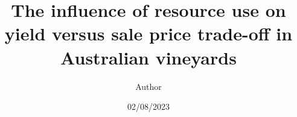 \documentclass[review,12pt,authoryear]{elsarticle}
\begin{document}
\begin{linenumbers}
\begin{frontmatter}
\title{The influence of resource use on yield versus sale price trade-off in Australian vineyards}
\author[label1,label2,label3]{Author}
\date{02/08/2023}
\begin{abstract}

\end{abstract}
\end{frontmatter}
\end{linenumbers}
\end{document}
